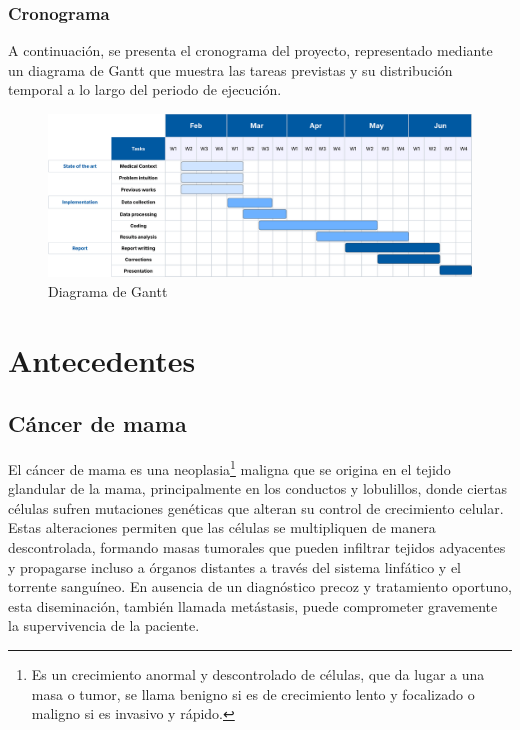 \documentclass[a4paper,10pt]{book}
\begin{document}
\subsection{Cronograma}

A continuación, se presenta el cronograma del proyecto, representado mediante un diagrama de Gantt que muestra las tareas previstas y su distribución temporal a lo largo del periodo de ejecución.

\begin{figure}[h!]
	\centering
	\includegraphics[width=1\linewidth]{reports//assets/RoadmapV3.png}
	\caption{Diagrama de Gantt}
	\label{fig:roadmap}
\end{figure}




\chapter{Antecedentes}

\section{Cáncer de mama}

El cáncer de mama es una neoplasia\footnote{Es un crecimiento anormal y descontrolado de células, que da lugar a una masa o tumor, se llama benigno si es de crecimiento lento y focalizado o maligno si es invasivo y rápido.} maligna que se origina en el tejido glandular de la mama, principalmente en los conductos y lobulillos, donde ciertas células sufren mutaciones genéticas que alteran su control de crecimiento celular. Estas alteraciones permiten que las células se multipliquen de manera descontrolada, formando masas tumorales que pueden infiltrar tejidos adyacentes y propagarse incluso a órganos distantes a través del sistema linfático y el torrente sanguíneo. En ausencia de un diagnóstico precoz y tratamiento oportuno, esta diseminación, también llamada metástasis, puede comprometer gravemente la supervivencia de la paciente.
\end{document}
